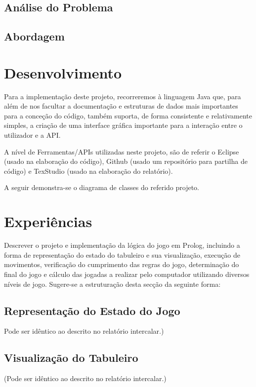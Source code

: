\documentclass[a4paper]{article}
\begin{document}
\subsection{Análise do Problema}


\subsection{Abordagem}

\newpage

\section{Desenvolvimento}
 Para a implementação deste projeto, recorreremos à linguagem Java que, para além de nos facultar a documentação e estruturas de dados mais importantes para a conceção do código, também suporta, de forma consistente e relativamente simples, a criação de uma interface gráfica importante para a interação entre o utilizador e a API.
 
 \par A nível de Ferramentas/APIs utilizadas neste projeto, são de referir o Eclipse (usado na elaboração do código), Github (usado um repositório para partilha de código) e TexStudio (usado na elaboração do relatório).
 \par A seguir demonstra-se o diagrama de classes do referido projeto.


\section{Experiências}

Descrever o projeto e implementação da lógica do jogo em Prolog, incluindo a forma de representação do estado do tabuleiro e sua visualização, execução de movimentos, verificação do cumprimento das regras do jogo, determinação do final do jogo e cálculo das jogadas a realizar pelo computador utilizando diversos níveis de jogo. Sugere-se a estruturação desta secção da seguinte forma:

\subsection{Representação do Estado do Jogo} Pode ser idêntico ao descrito no relatório intercalar.)

\subsection{Visualização do Tabuleiro} (Pode ser idêntico ao descrito no relatório intercalar.)
\end{document}
